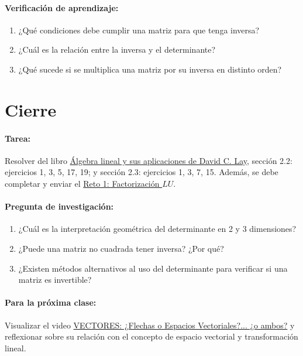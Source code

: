 \documentclass[a4,11pt]{aleph-notas}
\begin{document}
\paragraph{Verificación de aprendizaje:}  
\begin{enumerate}[leftmargin=*]  
    \item ¿Qué condiciones debe cumplir una matriz para que tenga inversa?  
    \item ¿Cuál es la relación entre la inversa y el determinante?  
    \item ¿Qué sucede si se multiplica una matriz por su inversa en distinto orden?  
\end{enumerate}  


\section*{Cierre}  

\paragraph{Tarea:}  
Resolver del libro \href{https://catalogobiblioteca.puce.edu.ec/cgi-bin/koha/opac-detail.pl?biblionumber=86083}{Álgebra lineal y sus aplicaciones de David C. Lay}, sección 2.2: ejercicios 1, 3, 5, 17, 19; y sección 2.3: ejercicios 1, 3, 7, 15.  
Además, se debe completar y enviar el \href{https://fcena-puce.github.io/AlgLinealyGeomAnalitica-05-N0068/1-Retos/Reto01.pdf}{Reto 1: Factorización $LU$}.  

\paragraph{Pregunta de investigación:}  
\begin{enumerate}[leftmargin=*]  
    \item ¿Cuál es la interpretación geométrica del determinante en 2 y 3 dimensiones?
    \item ¿Puede una matriz no cuadrada tener inversa? ¿Por qué?
    \item ¿Existen métodos alternativos al uso del determinante para verificar si una matriz es invertible?
\end{enumerate}  

\paragraph{Para la próxima clase:}  
Visualizar el video \href{https://youtu.be/eXA4806YuqY?si=8EsnZGPUa_kTr2nw}{VECTORES: ¿Flechas o Espacios Vectoriales?... ¿o ambos?} y reflexionar sobre su relación con el concepto de espacio vectorial y transformación lineal.
\end{document}
